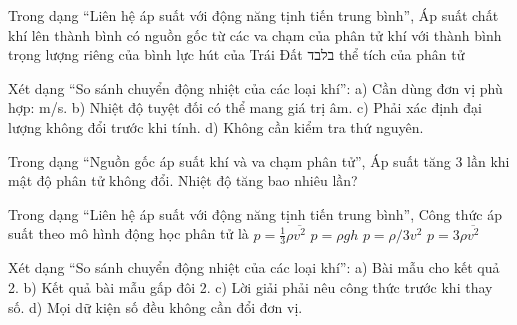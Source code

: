 \begin{ex}
Trong dạng “Liên hệ áp suất với động năng tịnh tiến trung bình”, Áp suất chất khí lên thành bình có nguồn gốc từ
\choice
{\True các va chạm của phân tử khí với thành bình}
{trọng lượng riêng của bình}
{lực hút của Trái Đất בלבד}
{thể tích của phân tử}
\end{ex}

\begin{ex}
Xét dạng “So sánh chuyển động nhiệt của các loại khí”: a) Cần dùng đơn vị phù hợp: m/s. b) Nhiệt độ tuyệt đối có thể mang giá trị âm. c) Phải xác định đại lượng không đổi trước khi tính. d) Không cần kiểm tra thứ nguyên.
\choiceTF

\end{ex}

\begin{ex}
Trong dạng “Nguồn gốc áp suất khí và va chạm phân tử”, Áp suất tăng 3 lần khi mật độ phân tử không đổi. Nhiệt độ tăng bao nhiêu lần?
\end{ex}

\begin{ex}
Trong dạng “Liên hệ áp suất với động năng tịnh tiến trung bình”, Công thức áp suất theo mô hình động học phân tử là
\choice
{\True $p=\frac13\rho\overline{v^2}$}
{$p=\rho gh$}
{$p=\rho/3v^2$}
{$p=3\rho\overline{v^2}$}
\end{ex}

\begin{ex}
Xét dạng “So sánh chuyển động nhiệt của các loại khí”: a) Bài mẫu cho kết quả 2. b) Kết quả bài mẫu gấp đôi 2. c) Lời giải phải nêu công thức trước khi thay số. d) Mọi dữ kiện số đều không cần đổi đơn vị.
\choiceTF

\end{ex}

